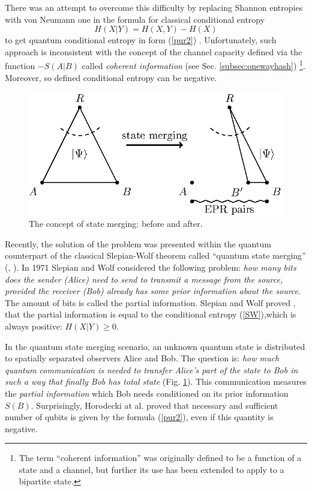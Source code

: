 \documentclass[rmp,12pt,preprint]{revtex4-2}
\begin{document}
There was an attempt \cite {cerfadami} to overcome this difficulty by
replacing Shannon entropies with von Neumann one in the formula for
classical conditional entropy
\begin{equation}
H(X|Y)=H(X,Y)-H(X) \label{SW}
\end{equation}
to get quantum conditional entropy in form (\ref {pur2}) \cite
{Wehrl}. Unfortunately, such approach is inconsistent with the concept
of the channel capacity defined via the function $-S(A|B)$ called {\it
  coherent information} (see Sec. \ref{subsec:onewayhash})
\cite{SchumacherN-1996-pra}\footnote{The term ``coherent information''
  was originally defined to be a function of a state and a channel,
  but further its use has been extended to apply to a bipartite
  state.}. Moreover, so defined conditional entropy can be
negative.


\begin{figure}
  \centering
%  
  \includegraphics{fig-merging}
  \caption{The concept of state merging: before and after.}
  \label{fig:merging}
\end{figure}

Recently, the solution of the problem was presented within the quantum
counterpart of the classical Slepian-Wolf theorem called ``quantum
state merging'' (\cite {SW-nature}, \cite {sw-long}). In 1971 Slepian
and Wolf considered the following problem: {\it how many bits does the
  sender (Alice) need to send to transmit a message from the source,
  provided the receiver (Bob) already has some prior information about
  the source}. The amount of bits is called the partial
information. Slepian and Wolf proved \cite {Slepian}, that the partial
information is equal to the conditional entropy (\ref {SW}),which is
always positive: $H(X|Y)\geq0$.

In the quantum state merging scenario, an unknown quantum state is
distributed to spatially separated observers Alice and Bob.  The
question is: {\it how much quantum communication is needed to transfer
  Alice's part of the state to Bob in such a way that finally Bob has
  total state} (Fig. \ref{fig:merging}). This communication measures
the { \it partial information} which Bob needs conditioned on its
prior information $S(B)$. Surprisingly, Horodecki at al. proved that
necessary and sufficient number of qubits is given by the formula
(\ref {pur2}), even if this quantity is negative.
\end{document}
